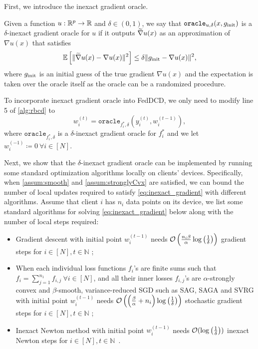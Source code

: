 First, we introduce the inexact gradient oracle. 
\begin{definition} 
Given a function $u : \mathbb{R}^p \to \mathbb{R}$ and $\delta \in (0,1)$, we say that $\texttt{oracle}_{u, \delta}(x, g_{\mathrm{init}})$ is a $\delta$-inexact gradient oracle for $u$ if it outputs $\widetilde{\nabla} u(x)$ as an approximation of $\nabla u(x)$ that satisfies
\begin{align}
        \mathbb{E}\left[\| \widetilde{\nabla} u(x) - {\nabla} u(x) \|^2\right] \leq \delta \| g_{\mathrm{init}} - {\nabla} u(x) \|^2, \label{eq:inexactOracle1}
\end{align}
where $g_{\mathrm{init}}$ is an initial guess of the true gradient $\nabla u(x)$ and the expectation is taken over the oracle itself as the oracle can be a randomized procedure.
\end{definition}
To incorporate inexact gradient oracle into FedDCD, we only need to modify line 5 of \autoref{alg:rbcd} to
\begin{equation} \label{eq:inexact_gradient}
    w_i^{(t)} = \texttt{oracle}_{f_i^*, \delta}(y^{(t)}_i, w_{i}^{(t-1)}),
\end{equation}
where $\texttt{oracle}_{f_i^*, \delta}$ is a $\delta$-inexact gradient oracle for $f_i^*$ and 
we let $w_i^{(-1)} \coloneqq 0~\forall i \in [N]$.

Next, we show that the $\delta$-inexact gradient oracle can be implemented by running some standard optimization algorithms locally on clients' devices. Specifically, when \autoref{assum:smooth} and \autoref{assum:stronglyCvx} are satisfied, we can bound the number of local updates required to satisfy \autoref{eq:inexact_gradient} with different algorithms. Assume that client $i$ has $n_i$ data points on its device, we list some standard algorithms for solving \autoref{eq:inexact_gradient} below along with the number of local steps required:
\begin{itemize}
    \item Gradient descent with initial point $w_i^{(t-1)}$ needs $\mathcal{O}\left( \frac{ n_i \beta}{\alpha} \log\left( \frac{1}{\delta} \right) \right)$ gradient steps for $i \in [N], t \in \mathbb{N}$ \citep{cvxopt_lecture};
    \item When each individual loss functions $f_i$'s are finite sums such that $f_i = \sum_{j=1}^{n_1} f_{i,j}~\forall i \in [N]$, and all their inner losses $f_{i,j}$'s are $\alpha$-strongly convex and $\beta$-smooth, variance-reduced SGD such as SAG, SAGA and SVRG with initial point $w^{(t-1)}_i$ needs $\mathcal{O}\left( \left( \frac{\beta}{\alpha} + n_i \right) \log\left( \frac{1}{\delta} \right) \right)$ stochastic gradient steps for $i \in [N], t \in \mathbb{N}$ \citep{roux2012stochastic,JohnsonZ13,DefazioBL14};
    \item Inexact Newton method with initial point $w^{(t-1)}_i$ needs $\mathcal{O}( \log\left( \frac{1}{\delta} \right) )$ inexact Newton steps for $i \in [N], t \in \mathbb{N}$~\citep{dembo1982inexact}.
\end{itemize}


